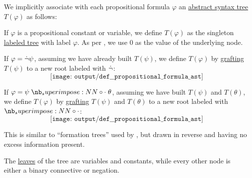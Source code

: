 \begin{definition}\label{def:propositional_formula_ast}\mimprovised
  We implicitly associate with each propositional formula \( \varphi \) an \hyperref[con:abstract_syntax_tree]{abstract syntax tree} \( T(\varphi) \) as follows:
  \begin{thmenum}
     If \( \varphi \) is a propositional constant or variable, we define \( T(\varphi) \) as the singleton \hyperref[def:labeled_tree]{labeled tree} with label \( \varphi \). As per , we use \( 0 \) as the value of the underlying node.

     If \( \varphi = \dot\neg \psi \), assuming we have already built \( T(\psi) \), we define \( T(\varphi) \) by \hyperref[def:ordered_tree_grafting_product]{grafting} \( T(\psi) \) to a new root labeled with \( \dot\neg \):
    \begin{equation*}
      \texttt{[image: output/def\_\_propositional\_formula\_ast]}
    \end{equation*}

     If \( \varphi = \psi \syncirc \theta \), assuming we have built \( T(\psi) \) and \( T(\theta) \), we define \( T(\varphi) \) by \hyperref[def:ordered_tree_grafting_product]{grafting} \( T(\psi) \) and \( T(\theta) \) to a new root labeled with \( \syncirc \):
    \begin{equation*}
      \texttt{[image: output/def\_\_propositional\_formula\_ast]}
    \end{equation*}
  \end{thmenum}
\end{definition}
\begin{comments}
  \item This is similar to \enquote{formation trees} used by , but drawn in reverse and having no excess information present.

  \item The \hyperref[def:rooted_tree/leaf]{leaves} of the tree are variables and constants, while every other node is either a binary connective or negation.
\end{comments}

